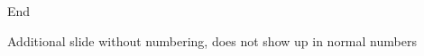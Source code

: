 \begin{frame}[standout]
    \Huge
    End
\end{frame}

\appendix
\backupbegin



\begin{frame}[c]{Additional slide}
    without numbering, does not show up in normal numbers
\end{frame}



\backupend

